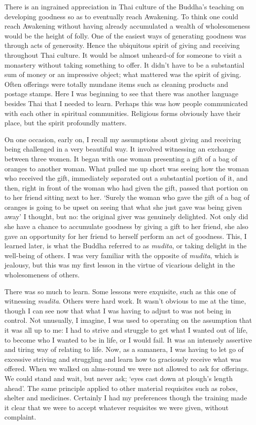 There is an ingrained appreciation in Thai culture of the Buddha's
teaching on developing goodness so as to eventually reach Awakening. To
think one could reach Awakening without having already accumulated a
wealth of wholesomeness would be the height of folly. One of the easiest
ways of generating goodness was through acts of generosity. Hence the
ubiquitous spirit of giving and receiving throughout Thai culture. It
would be almost unheard-of for someone to visit a monastery without
taking something to offer. It didn't have to be a substantial sum of
money or an impressive object; what mattered was the spirit of giving.
Often offerings were totally mundane items such as cleaning products and
postage stamps. Here I was beginning to see that there was another
language besides Thai that I needed to learn. Perhaps this was how
people communicated with each other in spiritual communities. Religious
forms obviously have their place, but the spirit profoundly matters.

On one occasion, early on, I recall my assumptions about giving and
receiving being challenged in a very beautiful way. It involved
witnessing an exchange between three women. It began with one woman
presenting a gift of a bag of oranges to another woman. What pulled me
up short was seeing how the woman who received the gift, immediately
separated out a substantial portion of it, and then, right in front of
the woman who had given the gift, passed that portion on to her friend
sitting next to her. `Surely the woman who gave the gift of a bag of
oranges is going to be upset on seeing that what she just gave was being
given away' I thought, but no: the original giver was genuinely
delighted. Not only did she have a chance to accumulate goodness by
giving a gift to her friend, she also gave an opportunity for her friend
to herself perform an act of goodness. This, I learned later, is what
the Buddha referred to as \emph{mudita}, or taking delight in the
well-being of others. I was very familiar with the opposite of \emph{mudita},
which is jealousy, but this was my first lesson in the virtue of
vicarious delight in the wholesomeness of others.

There was so much to learn. Some lessons were exquisite, such as this
one of witnessing \emph{mudita}. Others were hard work. It wasn't obvious to me
at the time, though I can see now that what I was having to adjust to
was not being in control. Not unusually, I imagine, I was used to
operating on the assumption that it was all up to me: I had to strive
and struggle to get what I wanted out of life, to become who I wanted to
be in life, or I would fail. It was an intensely assertive and tiring
way of relating to life. Now, as a samanera, I was having to let go of
excessive striving and struggling and learn how to graciously receive
what was offered. When we walked on alms-round we were not allowed to
ask for offerings. We could stand and wait, but never ask; `eyes cast
down at plough's length ahead'. The same principle applied to other
material requisites such as robes, shelter and medicines. Certainly I
had my preferences though the training made it clear that we were to
accept whatever requisites we were given, without complaint.

